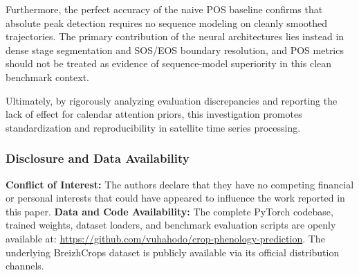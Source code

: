 \documentclass[runningheads]{llncs}
\begin{document}
Furthermore, the perfect accuracy of the naive POS baseline confirms that absolute peak detection requires no sequence modeling on cleanly smoothed trajectories. The primary contribution of the neural architectures lies instead in dense stage segmentation and SOS/EOS boundary resolution, and POS metrics should not be treated as evidence of sequence-model superiority in this clean benchmark context.

Ultimately, by rigorously analyzing evaluation discrepancies and reporting the lack of effect for calendar attention priors, this investigation promotes standardization and reproducibility in satellite time series processing. 

\subsubsection*{Disclosure and Data Availability}
\textbf{Conflict of Interest:} The authors declare that they have no competing financial or personal interests that could have appeared to influence the work reported in this paper.  
\textbf{Data and Code Availability:} The complete PyTorch codebase, trained weights, dataset loaders, and benchmark evaluation scripts are openly available at: \url{https://github.com/vuhahodo/crop-phenology-prediction}. The underlying BreizhCrops dataset is publicly available via its official distribution channels.
\end{document}
